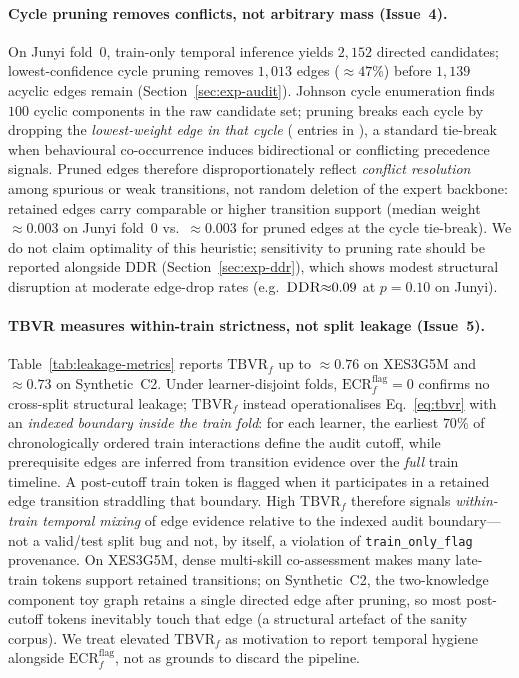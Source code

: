 \documentclass[pdflatex,sn-basic]{sn-jnl}
\newcommand{\KC}{knowledge component}
\newcommand{\DDR}{\textsc{DDR}}
\begin{document}
\paragraph{Cycle pruning removes conflicts, not arbitrary mass (Issue~4).}
On Junyi fold~0, train-only temporal inference yields $2{,}152$ directed
candidates; lowest-confidence cycle pruning removes $1{,}013$ edges
(${\approx}47\%$) before $1{,}139$ acyclic edges remain
(Section~\ref{sec:exp-audit}).
Johnson cycle enumeration finds $100$ cyclic components in the raw
candidate set; pruning breaks each cycle by dropping the \emph{lowest-weight
edge in that cycle} ( entries in
), a standard tie-break when
behavioural co-occurrence induces bidirectional or conflicting precedence
signals.
Pruned edges therefore disproportionately reflect \emph{conflict resolution}
among spurious or weak transitions, not random deletion of the expert
backbone: retained edges carry comparable or higher transition support
(median weight ${\approx}0.003$ on Junyi fold~0 vs.\ ${\approx}0.003$ for
pruned edges at the cycle tie-break).
We do not claim optimality of this heuristic; sensitivity to pruning rate
should be reported alongside \DDR{} (Section~\ref{sec:exp-ddr}), which
shows modest structural disruption at moderate edge-drop rates
(e.g.\ $\DDR{\approx}0.09$ at $p{=}0.10$ on Junyi).

\paragraph{TBVR measures within-train strictness, not split leakage (Issue~5).}
Table~\ref{tab:leakage-metrics} reports $\mathrm{TBVR}_f$ up to
${\approx}0.76$ on XES3G5M and ${\approx}0.73$ on Synthetic~C2.
Under learner-disjoint folds, $\mathrm{ECR}^{\mathrm{flag}}_f{=}0$ confirms
no cross-split structural leakage; $\mathrm{TBVR}_f$ instead operationalises
Eq.~\eqref{eq:tbvr} with an \emph{indexed boundary inside the train
fold}: for each learner, the earliest $70\%$ of chronologically ordered
train interactions define the audit cutoff, while prerequisite edges are
inferred from transition evidence over the \emph{full} train timeline.
A post-cutoff train token is flagged when it participates in a retained
edge transition straddling that boundary.
High $\mathrm{TBVR}_f$ therefore signals \emph{within-train temporal
mixing} of edge evidence relative to the indexed audit boundary---not a
valid/test split bug and not, by itself, a violation of
\texttt{train\_only\_flag} provenance.
On XES3G5M, dense multi-skill co-assessment makes many late-train tokens
support retained transitions; on Synthetic~C2, the two-\KC{} toy graph
retains a single directed edge after pruning, so most post-cutoff tokens
inevitably touch that edge (a structural artefact of the sanity corpus).
We treat elevated $\mathrm{TBVR}_f$ as motivation to report temporal
hygiene alongside $\mathrm{ECR}^{\mathrm{flag}}_f$, not as grounds to
discard the pipeline.
\end{document}
